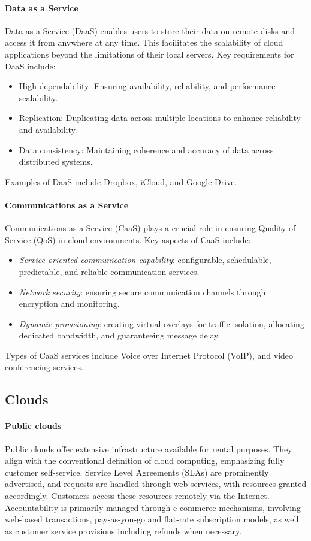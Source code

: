 \paragraph*{Data as a Service}
Data as a Service (DaaS) enables users to store their data on remote disks and access it from anywhere at any time. 
This facilitates the scalability of cloud applications beyond the limitations of their local servers.
Key requirements for DaaS include:
\begin{itemize}
    \item High dependability: Ensuring availability, reliability, and performance scalability.
    \item Replication: Duplicating data across multiple locations to enhance reliability and availability.
    \item Data consistency: Maintaining coherence and accuracy of data across distributed systems.
\end{itemize}
Examples of DaaS include Dropbox, iCloud, and Google Drive. 

\paragraph*{Communications as a Service}
Communications as a Service (CaaS) plays a crucial role in ensuring Quality of Service (QoS) in cloud environments.
Key aspects of CaaS include:
\begin{itemize}
    \item \textit{Service-oriented communication capability}: configurable, schedulable, predictable, and reliable communication services.
    \item \textit{Network security}: ensuring secure communication channels through encryption and monitoring.
    \item \textit{Dynamic provisioning}: creating virtual overlays for traffic isolation, allocating dedicated bandwidth, and guaranteeing message delay.
\end{itemize}
Types of CaaS services include Voice over Internet Protocol (VoIP), and video conferencing services. 

\subsection{Clouds}
\paragraph*{Public clouds}
Public clouds offer extensive infrastructure available for rental purposes. 
They align with the conventional definition of cloud computing, emphasizing fully customer self-service. 
Service Level Agreements (SLAs) are prominently advertised, and requests are handled through web services, with resources granted accordingly. 
Customers access these resources remotely via the Internet. 
Accountability is primarily managed through e-commerce mechanisms, involving web-based transactions, pay-as-you-go and flat-rate subscription models, as well as customer service provisions including refunds when necessary.

